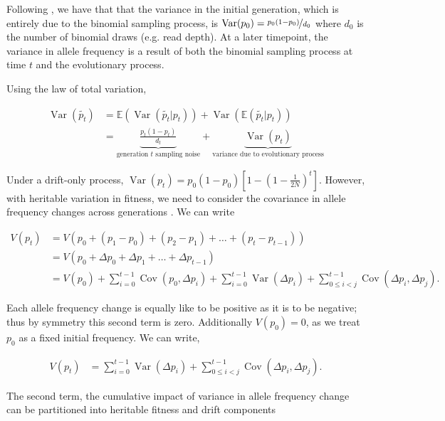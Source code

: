 \documentclass[11pt]{article}
\newcommand{\E}{\mathbb{E}}
\DeclareMathOperator{\var}{Var}
\DeclareMathOperator{\cov}{Cov}
\begin{document}
Following \textcite{Waples1989-sj}, we have that that the variance in the
initial generation, which is entirely due to the binomial sampling process, is
$\var(p_0) = \nicefrac{p_0(1-p_0)}{d_0}$ where $d_0$ is the number of binomial
draws (e.g. read depth). At a later timepoint, the variance in allele frequency
is a result of both the binomial sampling process at time $t$ and the
evolutionary process.

Using the law of total variation, 

\begin{align}
  \var(\widetilde{p_t}) &= \E(\var(\widetilde{p_t} | p_t)) + \var(\E(\widetilde{p_t}|p_t)) \\
                        &= \underbrace{\frac{p_t(1-p_t)}{d_t}}_\text{generation $t$ sampling noise} + \underbrace{\var(p_t)}_\text{variance due to evolutionary process}
\end{align}

Under a drift-only process, $\var(p_t) = p_0(1-p_0)\left[1- \left(1 -
\frac{1}{2N}\right)^t\right]$. However, with heritable variation in fitness, we
need to consider the covariance in allele frequency changes across generations
\parencite{Buffalo2019-io}. We can write

\begin{align}
  V(p_t) &= V\left(p_0 + (p_1 - p_0) + (p_2 - p_1) + \ldots + (p_t - p_{t-1}) \right) \\
         &= V\left(p_0 + \Delta p_0 + \Delta p_1 + \ldots + \Delta p_{t-1} \right) \\
         &= V(p_0) + \sum_{i=0}^{t-1} \cov(p_0, \Delta p_i) + \sum_{i=0}^{t-1} \var(\Delta p_i) + \sum_{0 \le i < j}^{t-1} \cov(\Delta p_i, \Delta p_j).
\end{align}
%

Each allele frequency change is equally like to be positive as it is to be
negative; thus by symmetry this second term is zero. Additionally $V(p_0) = 0$,
as we treat $p_0$ as a fixed initial frequency. We can write, 

\begin{align}
  V(p_t) &= \sum_{i=0}^{t-1} \var(\Delta p_i) + \sum_{0 \le i < j}^{t-1} \cov(\Delta p_i, \Delta p_j).
\end{align}

The second term, the cumulative impact of variance in allele frequency change
can be partitioned into heritable fitness and drift components
\parencite{Santiago1995-hx,Buffalo2019-io}
\end{document}
